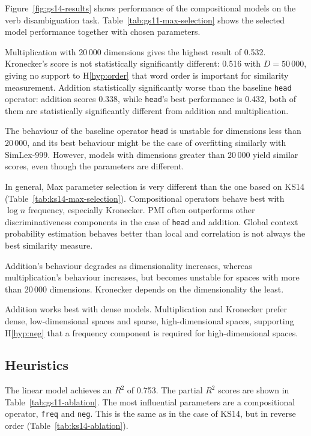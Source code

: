 

Figure~\ref{fig:gs14-results} shows performance of the compositional models on the verb disambiguation task. Table~\ref{tab:gs11-max-selection} shows the selected model performance together with chosen parameters.

Multiplication with 20\,000 dimensions gives the highest result of 0.532. Kronecker's score is not statistically significantly different: 0.516 with $D = 50\,000$, giving no support to H\ref{hyp:order} that word order is important for similarity measurement. Addition statistically significantly worse than the baseline \texttt{head} operator: addition scores 0.338, while \texttt{head}'s best performance is 0.432, both of them are statistically significantly different from addition and multiplication.

The behaviour of the baseline operator \texttt{head} is unstable for dimensions less than 20\,000, and its best behaviour might be the case of overfitting similarly with SimLex-999. However, models with dimensions greater than 20\,000 yield similar scores, even though the parameters are different.

In general, Max parameter selection is very different than the one based on KS14 (Table~\ref{tab:ks14-max-selection}). Compositional operators behave best with $\log n$ frequency, especially Kronecker. PMI often outperforms other discriminativeness components in the case of \texttt{head} and addition. Global context probability estimation behaves better than local and correlation is not always the best similarity measure.

Addition's behaviour degrades as dimensionality increases, whereas multiplication's behaviour increases, but becomes unstable for spaces with more than 20\,000 dimensions. Kronecker depends on the dimensionality the least.

Addition works best with dense models. Multiplication and Kronecker prefer dense, low-dimensional spaces and sparse, high-dimensional spaces, supporting H\ref{hyp:neg} that a frequency component is required for high-dimensional spaces.

\subsection{Heuristics}
\label{sec:heuristics-gs11}

The linear model achieves an $R^2$ of 0.753. The partial $R^2$ scores are shown in Table~\ref{tab:gs11-ablation}. The most influential parameters are a compositional operator, \texttt{freq} and \texttt{neg}. This is the same as in the case of KS14, but in reverse order (Table~\ref{tab:ks14-ablation}).


